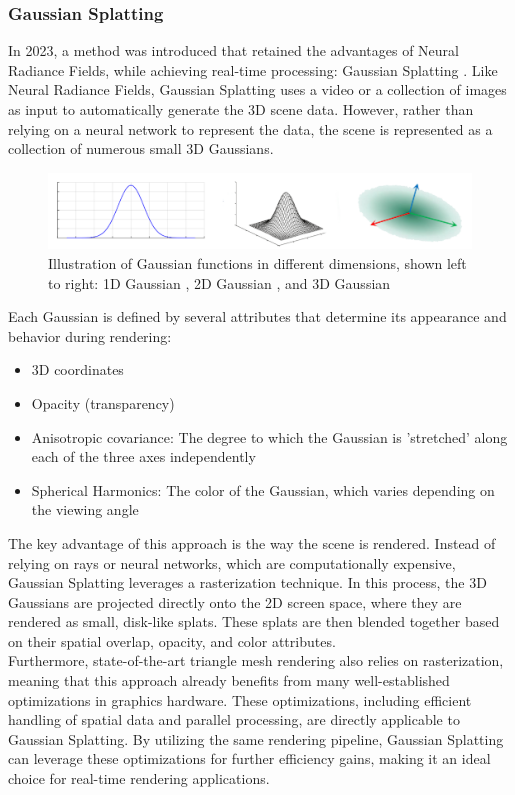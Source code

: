 \documentclass[12pt]{article}
\begin{document}
\subsubsection{Gaussian Splatting}
In 2023, a method was introduced that retained the advantages of Neural Radiance Fields, while achieving real-time processing: Gaussian Splatting \parencite{OriginalSplatting}. Like Neural Radiance Fields, Gaussian Splatting uses a video or a collection of images as input to automatically generate the 3D scene data. However, rather than relying on a neural network to represent the data, the scene is represented as a collection of numerous small 3D Gaussians.
\begin{figure}[h!]
	\centering
	\includegraphics[width=\textwidth]{Images/GaussianForm.png}
	\caption{Illustration of Gaussian functions in different dimensions, shown left to right: 1D Gaussian \parencite{1DGaussian}, 2D Gaussian \parencite{2DGaussian}, and 3D Gaussian \parencite{3DGaussian}}
	\label{fig:Form}
\end{figure}
\newpage  \noindent
Each Gaussian is defined by several attributes that determine its appearance and behavior during rendering:
\begin{itemize}
	\item 3D coordinates
	\item Opacity (transparency)
	\item Anisotropic covariance: The degree to which the Gaussian is 'stretched' along each of the three axes independently
	\item Spherical Harmonics: The color of the Gaussian, which varies depending on the viewing angle
\end{itemize}
The key advantage of this approach is the way the scene is rendered. Instead of relying on rays or neural networks, which are computationally expensive, Gaussian Splatting leverages a rasterization technique. In this process, the 3D Gaussians are projected directly onto the 2D screen space, where they are rendered as small, disk-like splats. These splats are then blended together based on their spatial overlap, opacity, and color attributes.\\
Furthermore, state-of-the-art triangle mesh rendering also relies on rasterization, meaning that this approach already benefits from many well-established optimizations in graphics hardware. These optimizations, including efficient handling of spatial data and parallel processing, are directly applicable to Gaussian Splatting. By utilizing the same rendering pipeline, Gaussian Splatting can leverage these optimizations for further efficiency gains, making it an ideal choice for real-time rendering applications.
\end{document}
